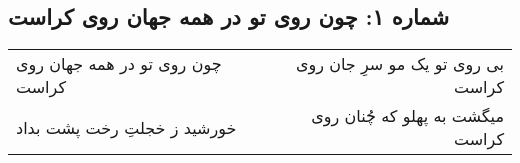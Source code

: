 \begin{center}
\section*{شماره ۱: چون روی تو در همه جهان روی کراست}
\label{sec:001}
\begin{longtable}{l p{0.5cm} r}
چون روی تو در همه جهان روی کراست
&&
بی روی تو یک مو سرِ جان روی کراست
\\
خورشید ز خجلتِ رخت پشت بداد
&&
میگشت به پهلو که چُنان روی کراست
\\
\end{longtable}
\end{center}
